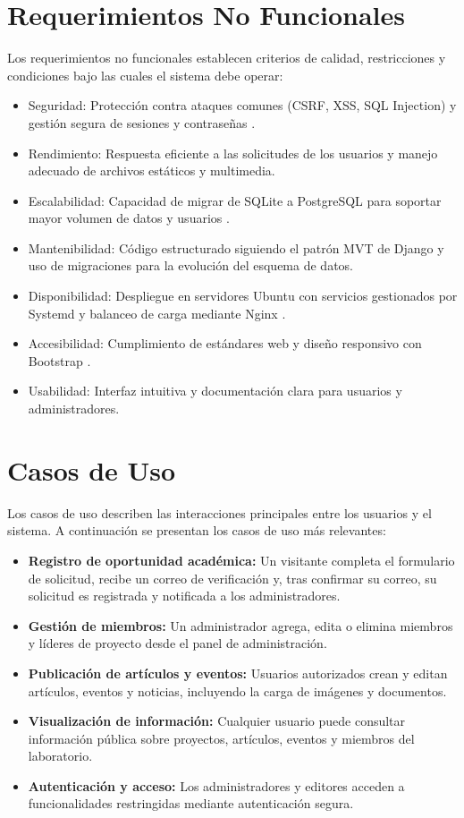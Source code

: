 \section{Requerimientos No Funcionales}
Los requerimientos no funcionales establecen criterios de calidad, restricciones y condiciones bajo las cuales el sistema debe operar:
\begin{itemize}
	\item Seguridad: Protección contra ataques comunes (CSRF, XSS, SQL Injection) y gestión segura de sesiones y contraseñas \cite{django-docs}.
	\item Rendimiento: Respuesta eficiente a las solicitudes de los usuarios y manejo adecuado de archivos estáticos y multimedia.
	\item Escalabilidad: Capacidad de migrar de SQLite a PostgreSQL para soportar mayor volumen de datos y usuarios \cite{postgresql-docs}.
	\item Mantenibilidad: Código estructurado siguiendo el patrón MVT de Django y uso de migraciones para la evolución del esquema de datos.
	\item Disponibilidad: Despliegue en servidores Ubuntu con servicios gestionados por Systemd y balanceo de carga mediante Nginx \cite{ubuntu-docs,nginx-docs}.
	\item Accesibilidad: Cumplimiento de estándares web y diseño responsivo con Bootstrap \cite{bootstrap-docs}.
	\item Usabilidad: Interfaz intuitiva y documentación clara para usuarios y administradores.
\end{itemize}
\section{Casos de Uso}
Los casos de uso describen las interacciones principales entre los usuarios y el sistema. A continuación se presentan los casos de uso más relevantes:

\begin{itemize}
	\item \textbf{Registro de oportunidad académica:} Un visitante completa el formulario de solicitud, recibe un correo de verificación y, tras confirmar su correo, su solicitud es registrada y notificada a los administradores.
	\item \textbf{Gestión de miembros:} Un administrador agrega, edita o elimina miembros y líderes de proyecto desde el panel de administración.
	\item \textbf{Publicación de artículos y eventos:} Usuarios autorizados crean y editan artículos, eventos y noticias, incluyendo la carga de imágenes y documentos.
	\item \textbf{Visualización de información:} Cualquier usuario puede consultar información pública sobre proyectos, artículos, eventos y miembros del laboratorio.
	\item \textbf{Autenticación y acceso:} Los administradores y editores acceden a funcionalidades restringidas mediante autenticación segura.
\end{itemize}
